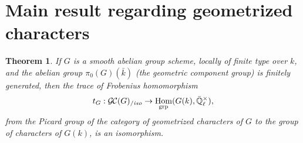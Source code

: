 \documentclass[11pt]{amsart}
\theoremstyle{plain}
\newtheorem{theorem}{Theorem}[section]
\theoremstyle{definition}
\theoremstyle{remark}
\newcommand{\EE}{\mathbb{\bar Q}_\ell}
\newcommand{\bFq}{\bar{k}}
\newcommand{\Fq}{k}
\newcommand{\EEx}{\EE^\times}
\DeclareMathOperator{\Hom}{Hom}
\newcommand{\GC}{{\mathcal{G\hskip-0.8pt C}}}
\newcommand{\GCiso}[1]{\GC(#1)_{/\textit{iso}}}
\newcommand{\trFrob}[1]{t_{#1}}
\begin{document}
%

\section{Main result regarding geometrized characters}

%
\begin{theorem}\label{thm:snake}
  If $G$ is a smooth abelian group scheme, locally of finite type over
  $\Fq$, and the abelian group $\pi_0(G)(\bFq)$ (the geometric
  component group) is finitely generated, then the trace of Frobenius
  homomorphism
  \[
  \trFrob{G} : \GCiso{G} \to \Hom_\text{grp}(G(\Fq),\EEx),
  \]
  from the Picard group of the category of geometrized characters of $G$ to
  the group of characters of $G(\Fq)$, is an isomorphism.
\end{theorem}
\end{document}
